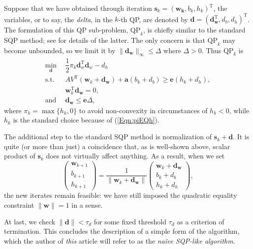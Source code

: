 \documentclass[11pt,a4paper]{article}
\theoremstyle{definition}
\renewcommand{\vec}[1]{\boldsymbol{#1}}
\begin{document}
      Suppose that we have obtained through iteration $\vec{s}_{k}=(\vec{w_{k}},b_{k},h_{k})^{\mathrm{T}}$, the variables, or to say, the \textit{delta}, in the $k$-th QP, are denoted by $\vec{d}=(\vec{d}_{\vec{w}}^{\mathrm{T}},d_{b},d_{h})^{\mathrm{T}}$. The formulation of this QP sub-problem, $\text{QP}_{k}$, is chiefly similar to the standard SQP method; see \cite[chap.18]{nocedal2006numerical} for details of the latter. The only concern is that $\text{QP}_{k}$ may become unbounded, so we limit it by $\|\vec{d}_{\vec{w}}\|_{\infty}\leq\Delta$ where $\Delta>0$. Thus $\text{QP}_{k}$ is
      \begin{align}
        \min_{\vec{d}}~~ & \dfrac{1}{2}\pi_{k}\vec{d}_{w}^{\mathrm{T}}\vec{d}_{w}-d_{h} \label{Eqn:QPk1}\\
        \text{s.t.}~~ & AV^{\mathrm{T}}(\vec{w}_{k}+\vec{d}_{\vec{w}})+\vec{a}(b_{k}+d_{b})\geq\vec{e}(h_{k}+d_{h}), \label{Eqn:QPk2}\\
        & \vec{w}_{k}^{\mathrm{T}}\vec{d}_{\vec{w}}=0, \label{Eqn:QPk3}\\
        \text{and}~~ & \vec{d}_{\vec{w}}\leq\vec{e}\Delta, \label{Eqn:QPk4}
      \end{align}
      where $\pi_{k}=\max\{h_{k},0\}$ to avoid non-convexity in circumstances of $h_{k}<0$, while $h_{k}$ is the standard choice because of (\ref{Eqn:piEQh}).

      The additional step to the standard SQP method is normalization of $\vec{s}_{k}+\vec{d}$. It is quite (or more than just) a coincidence that, as is well-shown above, scalar product of $\vec{s}_{k}$ does not virtually affect anything. As a result, when we set
      \begin{equation}
        \begin{pmatrix}
          \vec{w}_{k+1} \\ b_{k+1} \\ h_{k+1}
        \end{pmatrix}
        = \dfrac{1}{\|\vec{w}_{k}+\vec{d}_{\vec{w}}\|}
        \begin{pmatrix}
          \vec{w}_{k}+\vec{d}_{\vec{w}} \\ b_{k}+d_{b} \\ h_{k}+d_{h}
        \end{pmatrix},
      \end{equation}
      the new iterates remain feasible: we have still imposed the quadratic equality constraint $\|\vec{w}\|=1$ in a sense.

      At last, we check $\|\vec{d}\|<\tau_{d}$ for some fixed threshold $\tau_{d}$ as a criterion of termination. This concludes the description of a simple form of the algorithm, which the author of \emph{this} article will refer to as the \textit{na\"{i}ve SQP-like algorithm}.
\end{document}
